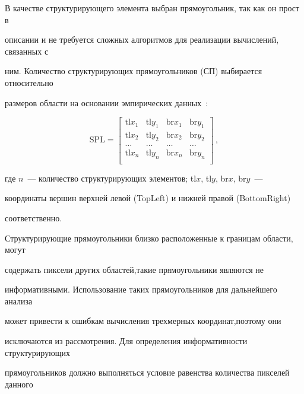 В качестве структурирующего элемента выбран пря\-мо\-уголь\-ник, так как он прост в 


описании и не требуется сложных ал\-го\-рит\-мов для реализации вычислений, связанных с 


ним. Ко\-ли\-чество структурирующих прямоугольников (СП) выбирается относи\-тель\-но 


размеров области на основании эмпирических данных~\cite{6-7}:


$$


\mathrm{SPL}=\begin{bmatrix}


\mathrm{tl}x_1 & \mathrm{tl}y_1 & \mathrm{br}x_1 & \mathrm{br}y_1\\


\mathrm{tl}x_2 & \mathrm{tl}y_2 & \mathrm{br}x_2 & \mathrm{br}y_2\\


\ldots &\ldots &\ldots &\ldots\\


\mathrm{tl}x_n & \mathrm{tl}y_n & \mathrm{br}x_n & \mathrm{br}y_n\\


\end{bmatrix}\,,


$$


где $n$~--- количество структурирующих элементов; tl$x$, tl$y$, br$x$, br$y$~--- 


координаты вершин верхней левой (TopLeft) и нижней правой (BottomRight) 


соответственно.





Структурирующие прямоугольники близко расположенные к границам области, могут 


содержать пиксели других областей,\linebreak такие прямоугольники являются не 


информативными. Использование таких прямоугольников для дальнейшего анализа 


может привести к ошибкам вычисления трехмерных координат,\linebreak поэтому они 


исключаются из рассмотрения. Для определения информативности структурирующих 


прямоугольников должно выполняться условие равенства количества пикселей дан\-но\-го\linebreak\vspace*{-12pt}


